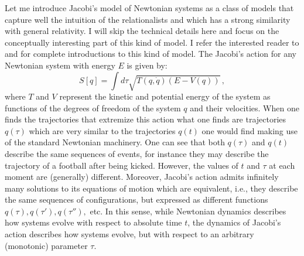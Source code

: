 \documentclass[12 pt]{article}
\begin{document}
Let me introduce Jacobi's model of Newtonian systems as a class of models that capture well the intuition of the relationalists and which has a strong similarity with general relativity. I will skip the technical details here and focus on the conceptually interesting part of this kind of model. I refer the interested reader to \citep{Barbour1994} and \citep{Gryb2010} for complete introductions to this kind of model. The Jacobi's action for any Newtonian system with energy $E$ is given by:
\begin{equation}
S[q]=\int d\tau \sqrt{T(q,\dot{q})(E-V(q))} \, ,
\end{equation}
where $T$ and $V$ represent the kinetic and potential energy of the system as functions of the degrees of freedom of the system $q$ and their velocities. When one finds the trajectories that extremize this action what one finds are trajectories $q(\tau)$ which are very similar to the trajectories $q(t)$ one would find making use of the standard Newtonian machinery. One can see that both $q(\tau)$ and $q(t)$ describe the same sequences of events, for instance they may describe the trajectory of a football after being kicked. However, the values of $t$ and $\tau$ at each moment are (generally) different. Moreover, Jacobi's action admits infinitely many solutions to its equations of motion which are equivalent, i.e., they describe the same sequences of configurations, but expressed as different functions $q(\tau), q(\tau '), q(\tau ''),$ etc. In this sense, while Newtonian dynamics describes how systems evolve with respect to absolute time $t$, the dynamics of Jacobi's action describes how systems evolve, but with respect to an arbitrary (monotonic) parameter $\tau$.
\end{document}

